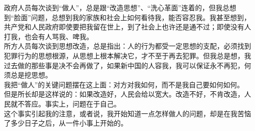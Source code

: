 政府人员每次谈到“做人”，总是跟“改造思想”、“洗心革面”连着的，但我总想到“脸面”问题，总想到我的家族和社会上如何看待我，能否容忍我。我甚至想到，共产党和人民政府即使要把我留在世上，到了社会上也许还是通不过；即使没有人打我，也会有人骂我、啤我。\\

所方人员每次谈到思想改造，总是指出：人的行为都受一定思想的支配，必须找到犯罪行为的思想根源，从思想上根本解决它，才不至于再去犯罪。但我总是想，我过去做的那些事是决不会再做了，如果新中国的人容我，我可以保证永不再犯，何须总是挖思想。\\

我把“做人”的关键问题摆在这上面：对方对我如何，而不是我自己要如何如何。\\

但是所长却是这样说的：如果改造好，人民会给以宽大。改造不好，不肯改造，人民就不答应。事实上，问题在于自己。\\

这个事实引起我的注意，或者说，我开始知道一点怎样做人的问题，却是在我苦恼了多少日子之后，从一件小事上开始的。\\